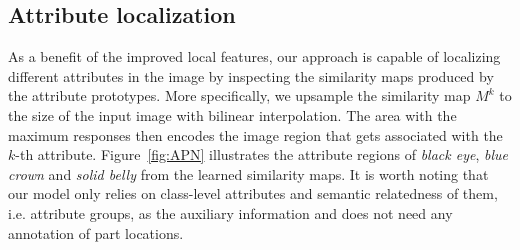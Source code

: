 \begin{comment}
\add{Similar to Zero-shot learning, the locality augmented image representations in our model are applicable to other data synthesis based FSL methods~\citep{xian2019, guan2020zero} and improve their performance. Thus we also test the effectiveness of our \texttt{APN features} on top of the generative models. The representation learning process is the same as above.
We fix the \texttt{Image Encoder} $f$, and use the global discriminative feature $g(x)$ to train a GAN-based few-shot learning approach that aims to augment training samples for novel classes. }


\end{comment}


\subsection{Attribute localization} 
\label{sec:Attri_loc}
As a benefit of the improved local features, our approach is capable of localizing different attributes in the image by inspecting the similarity maps produced by the attribute prototypes. 
More specifically, we upsample the similarity map $M^k$ to the size of the input image with bilinear interpolation. The area with the maximum responses then encodes the image region that gets associated with the $k$-th attribute.
Figure~\ref{fig:APN} illustrates the attribute regions of \textit{black eye}, \textit{blue crown} and \textit{solid belly} from the learned similarity maps. It is worth noting that our model only relies on class-level attributes and semantic relatedness of them, i.e. attribute groups, as the auxiliary information and does not need any annotation of part locations. 
 

 






